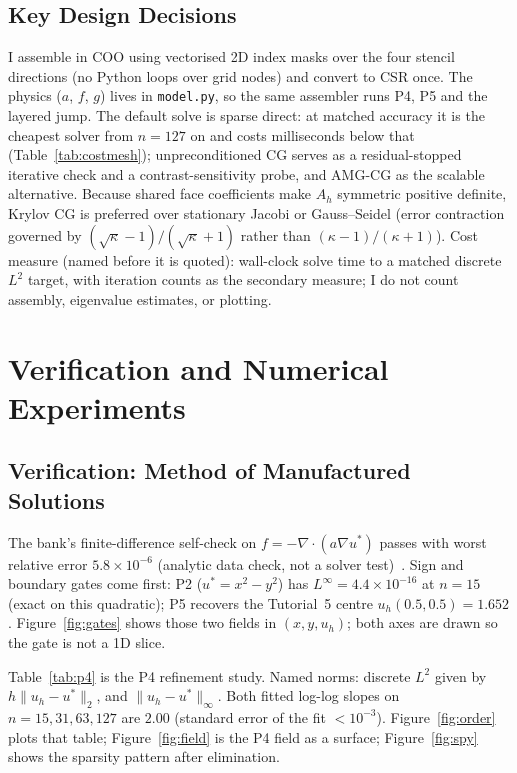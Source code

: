 \documentclass[11pt,a4paper]{article}
\begin{document}
\subsection{Key Design Decisions}
I assemble in COO using vectorised 2D index masks over the four stencil directions (no Python loops over grid nodes) and convert to CSR once.
The physics (\(a\), \(f\), \(g\)) lives in \texttt{model.py}, so the same assembler runs P4, P5 and the layered jump.
The default solve is sparse direct: at matched accuracy it is the cheapest solver from \(n=127\) on and costs milliseconds below that (Table~\ref{tab:costmesh}); unpreconditioned CG serves as a residual-stopped iterative check and a contrast-sensitivity probe, and AMG-CG as the scalable alternative.
Because shared face coefficients make \(A_h\) symmetric positive definite, Krylov CG is preferred over stationary Jacobi or Gauss--Seidel (error contraction governed by \((\sqrt{\kappa}-1)/(\sqrt{\kappa}+1)\) rather than \((\kappa-1)/(\kappa+1)\)).
Cost measure (named before it is quoted): wall-clock solve time to a matched discrete \(L^2\) target, with iteration counts as the secondary measure; I do not count assembly, eigenvalue estimates, or plotting.

\section{Verification and Numerical Experiments}
\label{sec:exp}
\subsection{Verification: Method of Manufactured Solutions}
The bank's finite-difference self-check on \(f=-\nabla\cdot(a\nabla u^*)\) passes with worst relative error \(5.8\times 10^{-6}\) (analytic data check, not a solver test)~\cite{problemPack}.
Sign and boundary gates come first: P2 (\(u^*=x^2-y^2\)) has \(L^\infty=4.4\times 10^{-16}\) at \(n=15\) (exact on this quadratic); P5 recovers the Tutorial~5 centre \(u_h(0.5,0.5)=1.652\).
Figure~\ref{fig:gates} shows those two fields in \((x,y,u_h)\); both axes are drawn so the gate is not a 1D slice.

Table~\ref{tab:p4} is the P4 refinement study.
Named norms: discrete \(L^2\) given by \(h\|u_h-u^*\|_2\), and \(\|u_h-u^*\|_\infty\).
Both fitted log-log slopes on \(n=15,31,63,127\) are \(2.00\) (standard error of the fit \(<10^{-3}\)).
Figure~\ref{fig:order} plots that table; Figure~\ref{fig:field} is the P4 field as a surface; Figure~\ref{fig:spy} shows the sparsity pattern after elimination.
\end{document}
